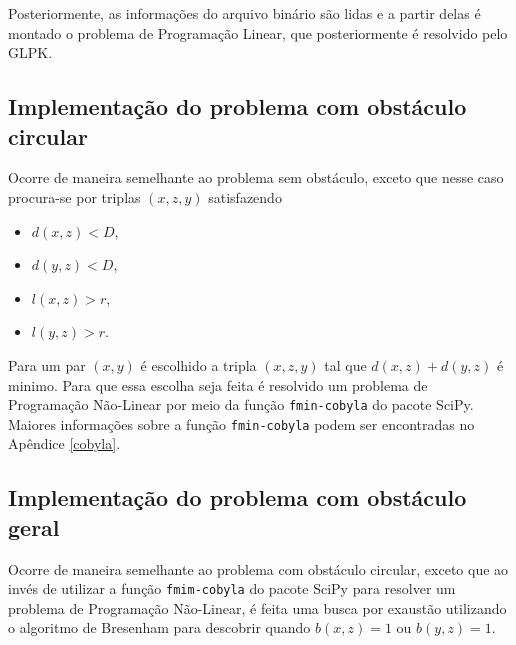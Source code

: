 Posteriormente, as informações do arquivo binário são lidas e a partir delas é
montado o problema de Programação Linear, que posteriormente é resolvido pelo
GLPK.

\subsection{Implementação do problema com obstáculo circular}
Ocorre de maneira semelhante ao problema sem obstáculo, exceto que nesse caso
procura-se por triplas $(x, z, y)$ satisfazendo 
\begin{itemize}
    \item $d(x, z) < D$,
    \item $d(y, z) < D$,
    \item $l(x, z) > r$,
    \item $l(y, z) > r$.
\end{itemize}

Para um par $(x, y)$ é escolhido a tripla $(x, z, y)$ tal que $d(x, z) + d(y,
z)$ é minimo. Para que essa escolha seja feita é resolvido um problema de
Programação Não-Linear por meio da função \texttt{fmin-cobyla} do pacote SciPy.
Maiores
informações sobre a função \texttt{fmin-cobyla} podem ser encontradas no
Apêndice \ref{cobyla}.

\subsection{Implementação do problema com obstáculo geral}
Ocorre de maneira semelhante ao problema com obstáculo circular, exceto que ao
invés de utilizar a função \texttt{fmim-cobyla} do pacote SciPy para resolver
um problema de Programação Não-Linear, é feita uma busca por exaustão utilizando
o algoritmo de Bresenham para descobrir quando $b(x, z) = 1$ ou $b(y, z) = 1$.

